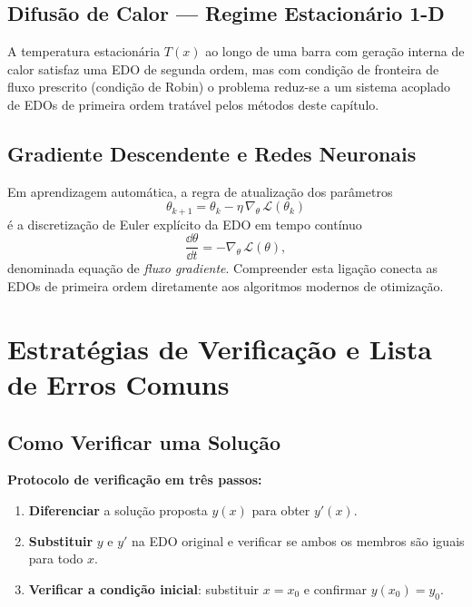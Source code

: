 \subsection{Difusão de Calor --- Regime Estacionário 1-D}

A temperatura estacionária $T(x)$ ao longo de uma barra com geração interna de calor
satisfaz uma EDO de segunda ordem, mas com condição de fronteira de fluxo prescrito
(condição de Robin) o problema reduz-se a um sistema acoplado de EDOs de primeira ordem
tratável pelos métodos deste capítulo.

\subsection{Gradiente Descendente e Redes Neuronais}

Em aprendizagem automática, a regra de atualização dos parâmetros
\[
  \theta_{k+1} = \theta_k - \eta\,\nabla_{\!\theta}\,\mathcal{L}(\theta_k)
\]
é a discretização de Euler explícito da EDO em tempo contínuo
\[
  \frac{\dd\theta}{\dd t} = -\nabla_{\!\theta}\,\mathcal{L}(\theta),
\]
denominada equação de \emph{fluxo gradiente}. Compreender esta ligação conecta as EDOs de
primeira ordem diretamente aos algoritmos modernos de otimização.

\section{Estratégias de Verificação e Lista de Erros Comuns}
\label{sec:verification5}

\subsection{Como Verificar uma Solução}

\begin{tipbox}
  \textbf{Protocolo de verificação em três passos:}
  \begin{enumerate}
    \item \textbf{Diferenciar} a solução proposta $y(x)$ para obter $y'(x)$.
    \item \textbf{Substituir} $y$ e $y'$ na EDO original e verificar se ambos os membros
          são iguais para todo $x$.
    \item \textbf{Verificar a condição inicial}: substituir $x=x_0$ e confirmar
          $y(x_0)=y_0$.
  \end{enumerate}
\end{tipbox}

